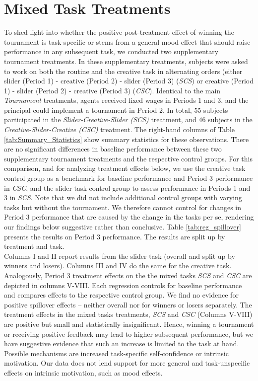\section{Mixed Task Treatments}
\label{mixed}

To shed light into whether the positive post-treatment effect of winning the tournament 
is task-specific or stems from a general mood effect that should raise performance in any subsequent task, we conducted two 
supplementary tournament treatments. In these supplementary treatments, subjects were asked to 
work on both the routine and the creative task in alternating orders (either 
slider (Period 1) - creative (Period 2) - slider (Period 3) (\textit{SCS}) or 
creative (Period 1) - slider (Period 2) - creative (Period 3) (\textit{CSC}). 
Identical to the main \textit{Tournament} treatments, 
agents received fixed wages in Periods 1 and 3, and the principal could 
implement a tournament in Period 2. In total, 55 subjects participated in the 
\textit{ Slider-Creative-Slider (SCS)} treatment, and 46 subjects 
 in the \textit{ Creative-Slider-Creative (CSC)} treatment. 
The right-hand  columns of Table \ref{tab:Summary_Statistics} show 
summary statistics for these observations. There are no significant differences in 
baseline performance between these two  supplementary tournament treatments 
and the respective control groups. For this comparison, and for analyzing treatment effects below, 
we use the creative task control group as a benchmark for 
baseline performance and  Period 3 performance in \textit{CSC}, 
and the slider task control group to assess 
performance in Periods 1 and 3 in \textit{SCS}. Note that we did not include 
additional control groups with varying tasks but without the tournament. 
We therefore cannot control for changes in Period 3 performance 
that are caused by the change in the tasks per se, rendering our findings below suggestive 
rather than conclusive. 
Table \ref{tab:reg_spillover} presents the results on Period 3 performance. 
The results are split up by treatment and task.\\


%

Columns I and II report results from the slider task (overall and split up by winners and losers). 
Columns III and IV do the same for the creative task. Analogously, Period 3 treatment effects on the 
the mixed tasks \textit{SCS} and \textit{CSC} are depicted in columns V-VIII. 
Each regression controls for baseline performance and compares effects to the respective control group.
We find no evidence for positive spillover effects -- neither overall nor for winners or losers separately. 
The treatment effects in the mixed tasks treatments, \textit{SCS} and \textit{CSC} (Columns V-VIII) are positive 
but small and statistically insignificant. Hence,  winning  a tournament or receiving positive feedback 
may lead to higher subsequent performance, but we have suggestive evidence that such an increase is limited to the task at hand. Possible 
mechanisms are increased task-specific self-confidence or intrinsic motivation. Our data does not lend
support for more general and task-unspecific effects on intrinsic motivation, such as mood effects. 